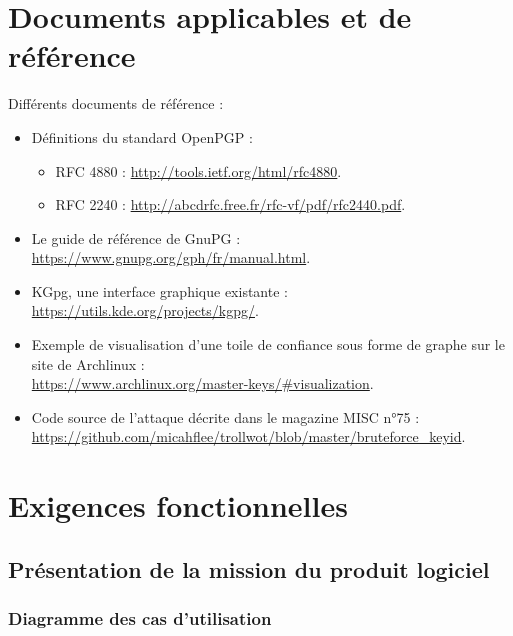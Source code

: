 \documentclass{../res/univ-projet}
\begin{document}
\section{Documents applicables et de référence}
Différents documents de référence :
\begin{itemize}
\item Définitions du standard OpenPGP :
  \begin{itemize}
    \item RFC 4880 : \href{http://tools.ietf.org/html/rfc4880}{http://tools.ietf.org/html/rfc4880}.
    \item RFC 2240 : \href{http://abcdrfc.free.fr/rfc-vf/pdf/rfc2440.pdf}{http://abcdrfc.free.fr/rfc-vf/pdf/rfc2440.pdf}.
  \end{itemize}
\item Le guide de référence de GnuPG : \href{https://www.gnupg.org/gph/fr/manual.html}{https://www.gnupg.org/gph/fr/manual.html}.
\item KGpg, une interface graphique existante : \href{https://utils.kde.org/projects/kgpg/}{https://utils.kde.org/projects/kgpg/}.
\item Exemple de visualisation d'une toile de confiance sous forme de graphe sur le site de Archlinux : \\
  \href{https://www.archlinux.org/master-keys/#visualization}{https://www.archlinux.org/master-keys/\#visualization}.
\item Code source de l'attaque décrite dans le magazine MISC n°75 : \\ 
\href{https://github.com/micahflee/trollwot/blob/master/bruteforce_keyid}{https://github.com/micahflee/trollwot/blob/master/bruteforce\_keyid}.
\end{itemize}


\section{Exigences fonctionnelles}
\subsection{Présentation de la mission du produit logiciel}

\subsubsection{Diagramme des cas d'utilisation}
\end{document}
